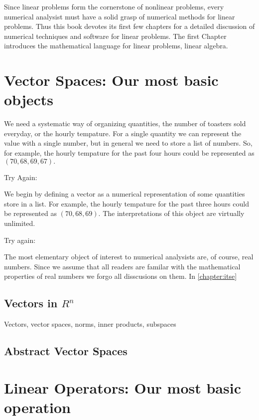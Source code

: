 Since linear problems form the cornerstone of nonlinear problems,
every numerical analysist must have a solid grasp of numerical methods
for linear problems. Thus this book devotes its first few chapters for 
a detailed discussion of numerical techniques and software for linear problems.
The first Chapter introduces the mathematical language for linear problems, linear
algebra. 


\section{Vector Spaces: Our most basic objects}


We need a systematic way of organizing quantities, the number of toasters sold 
everyday, or the hourly tempature. For a single quantity we can represent the 
value with a single number, but in general we need to store a list of numbers. So,
for example, the hourly tempature for the past four hours could be represented
as $ ( 70, 68, 69, 67). $

Try Again: 

We begin by defining a vector as a numerical representation of some quantities
store in a list. For example, the hourly tempature for the past three hours could 
be represented as $ ( 70, 68, 69). $ The interpretations of this object are 
virtually unlimited.

Try again:

The most elementary object of interest to numerical analysists are, of course, 
real numbers. Since we assume that all readers are familar with the mathematical
properties of real numbers we forgo all disscusions on them. In \ref{chapter:itse}




\subsection{Vectors in $R^n$}

Vectors, vector spaces, norms, inner products, subspaces

\subsection{Abstract Vector Spaces}

\section{Linear Operators: Our most basic operation}

